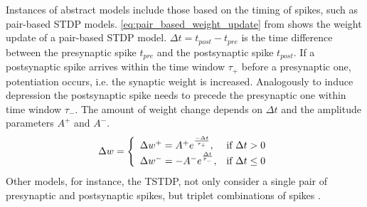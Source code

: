 Instances of abstract models include those based on the timing of spikes, such as pair-based \ac{STDP} models.
\autoref{eq:pair_based_weight_update} from \cite{Synaptic_plasticity} shows the weight update of a pair-based \ac{STDP} model.
$\Delta t = t_{post} - t_{pre}$ is the time difference between the presynaptic spike $t_{pre}$ and the postsynaptic spike $t_{post}$.
If a postsynaptic spike arrives within the time window $\tau_+$ before a presynaptic one, potentiation occurs, i.e. the synaptic weight is increased. 
Analogously to induce depression the postsynaptic spike needs to precede the presynaptic one within time window $\tau_-$.
The amount of weight change depends on $\Delta t $ and the amplitude parameters $A^+$ and $A^-$.
%
\begin{equation}
    \centering
    \label{eq:pair_based_weight_update}
    \Delta w = \left\{
        \begin{array}{ll}
        \Delta w^+ = A^+ e^{\frac{-\Delta t}{\tau_+}}, & \text{if } \Delta t > 0 \\
        \Delta w^- = -A^- e^{\frac{\Delta t}{\tau_-}}, & \text{if } \Delta t \le 0 \\
        \end{array}
        \right.
\end{equation}
%
Other models, for instance, the \ac{TSTDP}, not only consider a single pair of presynaptic and postsynaptic spikes, 
but triplet combinations of spikes \cite{Synaptic_plasticity,STDP_triplet}.

